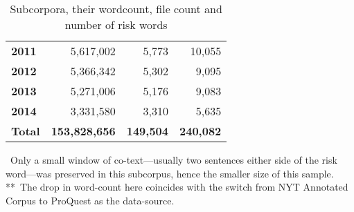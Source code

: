 \begin{table}
\begin{tabular}{p{1.5cm}rrr}
\textbf{2011} & 5,617,002 & 5,773 & 10,055  \\ 
\textbf{2012} & 5,366,342 & 5,302 &  9,095  \\ 
\textbf{2013} & 5,271,006 & 5,176 &  9,083  \\ 
\textbf{2014} & 3,331,580 & 3,310 &  5,635 \\ 
\textbf{Total} & \textbf{153,828,656} & \textbf{149,504} & \textbf{240,082} \\ \bottomrule
\end{tabular}
    \caption{Subcorpora, their wordcount, file count and number of risk words}
    \label{tab:stats}
    \medskip %
\begin{minipage}{0.9\textwidth} %
{\footnotesize *~Only a small window of co-text---usually two sentences either side of the risk word---was preserved in this subcorpus, hence the smaller size of this sample.~\\
 \mbox{*}\mbox{*}~The drop in word-count here coincides with the switch from NYT Annotated Corpus to ProQuest as the data-source.\par}
\end{minipage}
\end{table}


